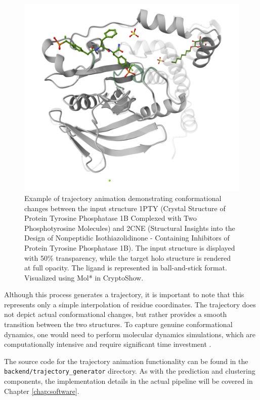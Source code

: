 \begin{figure}[htbp]
    \centering
    \includegraphics[width=\textwidth]{img/trajectory_animation.png}
    \caption{Example of trajectory animation demonstrating conformational changes between the input structure 1PTY (Crystal Structure of Protein Tyrosine Phosphatase 1B Complexed with Two Phosphotyrosine Molecules) and 2CNE (Structural Insights into the Design of Nonpeptidic Isothiazolidinone - Containing Inhibitors of Protein Tyrosine Phosphatase 1B). The input structure is displayed with 50\% transparency, while the target holo structure is rendered at full opacity. The ligand is represented in ball-and-stick format. Visualized using Mol* in CryptoShow.}
    \label{fig:trajectory-animation}
\end{figure}
Although this process generates a trajectory, it is important to note that this represents only a simple interpolation of residue coordinates. The trajectory does not depict actual conformational changes, but rather provides a smooth transition between the two structures. To capture genuine conformational dynamics, one would need to perform molecular dynamics simulations, which are computationally intensive and require significant time investment \cite{schlitter1993targeted}.

The source code for the trajectory animation functionality can be found in the \lstinline!backend/trajectory_generator! directory. As with the prediction and clustering components, the implementation details in the actual pipeline will be covered in Chapter \ref{chap:software}.



